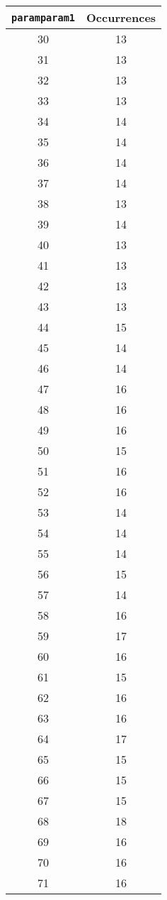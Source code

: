 \documentclass[letterpaper, 12pt]{article}
\begin{document}
\begin{longtable}{|c|c|}
\hline
\textbf{\texttt{paramparam1}} & \textbf{Occurrences} \\
\hline
30 & 13 \\
\hline
31 & 13 \\
\hline
32 & 13 \\
\hline
33 & 13 \\
\hline
34 & 14 \\
\hline
35 & 14 \\
\hline
36 & 14 \\
\hline
37 & 14 \\
\hline
38 & 13 \\
\hline
39 & 14 \\
\hline
40 & 13 \\
\hline
41 & 13 \\
\hline
42 & 13 \\
\hline
43 & 13 \\
\hline
44 & 15 \\
\hline
45 & 14 \\
\hline
46 & 14 \\
\hline
47 & 16 \\
\hline
48 & 16 \\
\hline
49 & 16 \\
\hline
50 & 15 \\
\hline
51 & 16 \\
\hline
52 & 16 \\
\hline
53 & 14 \\
\hline
54 & 14 \\
\hline
55 & 14 \\
\hline
56 & 15 \\
\hline
57 & 14 \\
\hline
58 & 16 \\
\hline
59 & 17 \\
\hline
60 & 16 \\
\hline
61 & 15 \\
\hline
62 & 16 \\
\hline
63 & 16 \\
\hline
64 & 17 \\
\hline
65 & 15 \\
\hline
66 & 15 \\
\hline
67 & 15 \\
\hline
68 & 18 \\
\hline
69 & 16 \\
\hline
70 & 16 \\
\hline
71 & 16 \\

\end{longtable}
\end{document}
